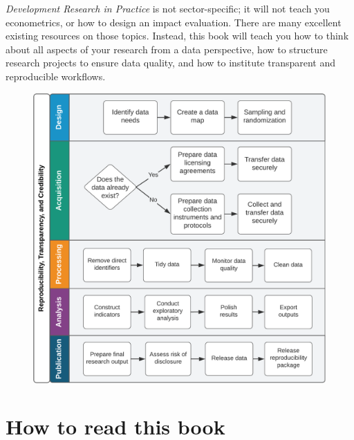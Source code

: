 \textit{Development Research in Practice} is not sector-specific;
it will not teach you econometrics,
or how to design an impact evaluation.
There are many excellent existing resources on those topics.
Instead, this book will teach you how to think about all aspects of your research from a data perspective,
how to structure research projects to ensure data quality,
and how to institute transparent and reproducible workflows.




\begin{fullwidth}
	\begin{figure}
		\centering
		\includegraphics[width=1.5\linewidth]{diagrams/Introduction}
		\label{fig:intro}
	\end{figure}
\end{fullwidth}

\section{How to read this book}

